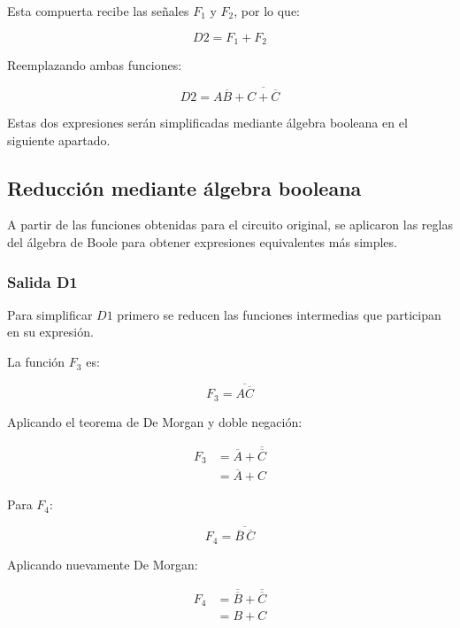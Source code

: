 \documentclass[12pt]{report}
\begin{document}
Esta compuerta recibe las señales $F_1$ y $F_2$, por lo que:

\begin{equation}
    D2 = F_1 + F_2
\end{equation}

Reemplazando ambas funciones:

\begin{equation}
    D2 =
    A\overline{B}
    +
    \overline{C+\overline{C}}
\end{equation}

Estas dos expresiones serán simplificadas mediante álgebra booleana en el
siguiente apartado.


\subsection{Reducción mediante álgebra booleana}

A partir de las funciones obtenidas para el circuito original, se aplicaron las
reglas del álgebra de Boole para obtener expresiones equivalentes más simples.

\subsubsection{Salida D1}

Para simplificar $D1$ primero se reducen las funciones intermedias que participan
en su expresión.

La función $F_3$ es:

\begin{equation}
    F_3 = \overline{A\overline{C}}
\end{equation}

Aplicando el teorema de De Morgan y doble negación:

\begin{align}
    F_3
    &= \overline{A} + \overline{\overline{C}} \\
    &= \overline{A} + C
\end{align}

Para $F_4$:

\begin{equation}
    F_4 = \overline{\overline{B}\,\overline{C}}
\end{equation}

Aplicando nuevamente De Morgan:

\begin{align}
    F_4
    &= \overline{\overline{B}}
       + \overline{\overline{C}} \\
    &= B + C
\end{align}
\end{document}
